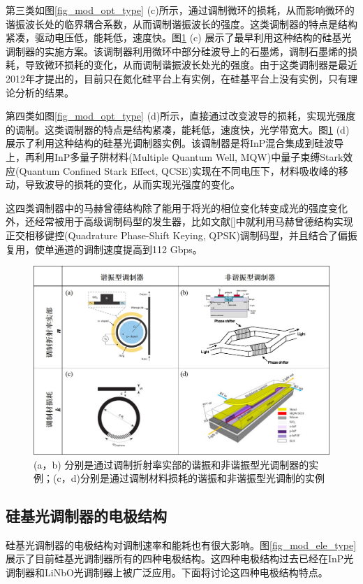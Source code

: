 第三类如图\ref{fig_mod_opt_type} (c)所示，通过调制微环的损耗，从而影响微环的谐振波长处的临界耦合系数，从而调制谐振波长的强度。这类调制器的特点是结构紧凑，驱动电压低，能耗低，速度快。图\ref{fig_mod_opt_type_real} (c) 展示了最早利用这种结构的硅基光调制器的实施方案\cite{Midrio2012graphene}。该调制器利用微环中部分硅波导上的石墨烯，调制石墨烯的损耗，导致微环损耗的变化，从而调制谐振波长处光的强度。由于这类调制器是最近2012年才提出的，目前只在氮化硅平台上有实例\cite{phare2015graphene}，在硅基平台上没有实例，只有理论分析的结果\cite{Midrio2012graphene}。

第四类如图\ref{fig_mod_opt_type} (d)所示，直接通过改变波导的损耗，实现光强度的调制。这类调制器的特点是结构紧凑，能耗低，速度快，光学带宽大。图\ref{fig_mod_opt_type_real} (d) 展示了利用这种结构的硅基光调制器实例\cite{tang201150}。该调制器是将InP混合集成到硅波导上，再利用InP多量子阱材料(Multiple Quantum Well, MQW)中量子束缚Stark效应(Quantum Confined Stark Effect, QCSE)实现在不同电压下，材料吸收峰的移动，导致波导的损耗的变化，从而实现光强度的变化。

这四类调制器中的马赫曾德结构除了能用于将光的相位变化转变成光的强度变化外，还经常被用于高级调制码型的发生器，比如文献[]中就利用马赫曾德结构实现正交相移键控(Quadrature Phase-Shift Keying, QPSK)调制码型，并且结合了偏振复用，使单通道的调制速度提高到112 Gbps。
\begin{figure}[htb]
	\centering
	\includegraphics[width=12cm]{./Pictures/fig_mod_opt_type_real.jpg}
	\caption{ (a，b) 分别是通过调制折射率实部的谐振和非谐振型光调制器的实例\cite{xu2005micrometre,liu2004high}；(c，d)分别是通过调制材料损耗的谐振和非谐振型光调制的实例\cite{Midrio2012graphene,tang201150}}
	\label{fig_mod_opt_type_real}
\end{figure}

\subsection{硅基光调制器的电极结构} \label{electrostructure}
硅基光调制器的电极结构对调制速率和能耗也有很大影响。图\ref{fig_mod_ele_type}展示了目前硅基光调制器所有的四种电极结构。这四种电极结构过去已经在InP光调制器和LiNbO光调制器上被广泛应用。下面将讨论这四种电极结构特点。

